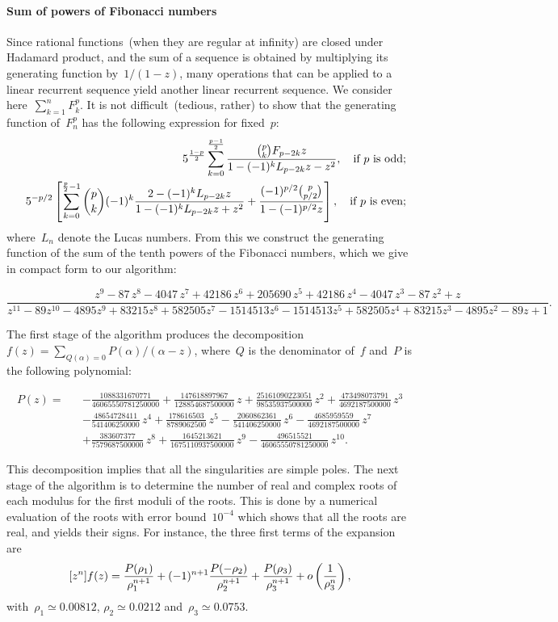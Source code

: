 \paragraph{Sum of powers of Fibonacci numbers} Since
rational  functions~(when they  are  regular at  infinity)  are closed
under  Hadamard  product, and  the sum of  a sequence  is obtained  by
multiplying its generating function by~$1/(1-z)$, many operations that
can be applied  to a  linear recurrent  sequence  yield another linear
recurrent sequence.  We consider here~$\sum_{k=1}^n{F_k^p}$. It is not
difficult~(tedious, rather) to   show  that  the  generating  function
of~$F_n^p$ has the following expression for fixed~$p$:
\begin{eqnarray*}
  &&5^{1-p\over2}\sum_{k=0}^{p-1\over2}{{p\choose k}F_{p-2k}z\over
    1-(-1)^kL_{p-2k}z-z^2},\quad\hbox{if $p$ is odd;}\\
  &&5^{-p/2}\left[\sum_{k=0}^{{p\over2}-1}{{p\choose k}(-1)^k{
      2-(-1)^kL_{p-2k}z\over1-(-1)^kL_{p-2k}z+z^2}+
    {(-1)^{p/2}{p\choose p/2}\over1-(-1)^{p/2}z}}\right],
  \quad\hbox{if $p$ is even;}
\end{eqnarray*}
where~$L_n$ denote the   Lucas  numbers.  From this  we  construct the
generating function of  the sum  of  the tenth powers of the Fibonacci
numbers, which we give in compact form to our algorithm: 
\begin{small}
\[\frac{z^9-87\,z^8-4047\,z^7+42186\,z^6+205690\,z^5+42186\,z^4-4047\,
z^3-87\,z^2+z}{z^{11}\!-\!89z^{10}\!-\!4895z^9\!+\!83215z^8\!+\!582505z^7\!-\!
1514513z^6\!-\!1514513z^5\!+\!582505z^4\!+\!83215z^3\!-\!4895z^2\!-\!89z\!+\!1}.\]
\end{small}
The first stage of the algorithm produces the decomposition 
$f(z)=\sum_{Q(\alpha)=0}{P(\alpha)/(\alpha-z)}$,
where~$Q$ is the denominator of~$f$ and~$P$ is the following polynomial:
\begin{small}
\begin{eqnarray*}
P(z)=&&
-{\frac {1088331670771}{46065550781250000}}
+{\frac {147618897967}{128854687500000}}\,z
+{\frac {25161090223051}{98535937500000}}\,z^2
+{\frac {473498073791}{4692187500000}}\,z^3\\
&&-{\frac {48654728411}{541406250000}}\,z^4
+{\frac {178616503}{8789062500}}\,z^5
-{\frac {2060862361}{541406250000}}\,z^6
-{\frac {4685959559}{ 4692187500000}}\,z^7\\
&&+{\frac {383607377}{7579687500000}}\,z^8
+{\frac {1645213621}{1675110937500000}}\,z^9
-{\frac {496515521}{46065550781250000}}\,z^{10}.
\end{eqnarray*}
\end{small}
This decomposition implies that all the singularities are simple
poles. The next stage of the 
algorithm is to determine the number of real and complex roots of each
modulus for the first moduli of the roots. This is done by a numerical
evaluation of the roots with error bound~$10^{-4}$ which shows that
all the roots 
are real, and yields their signs. For instance, the three first terms
of the expansion are
$$[z^n]f(z)= {P(\rho_1)\over  \rho_1^{n+1}} + (-1)^{n+1}{ P(-\rho_2)
\over \rho_2^{n+1}} + {P(\rho_3) \over \rho_3^{n+1}} + o \left( {1
\over \rho_3^n }\right),$$
with~$\rho_1\simeq0.00812$, $\rho_2\simeq0.0212$
and~$\rho_3\simeq0.0753$.

